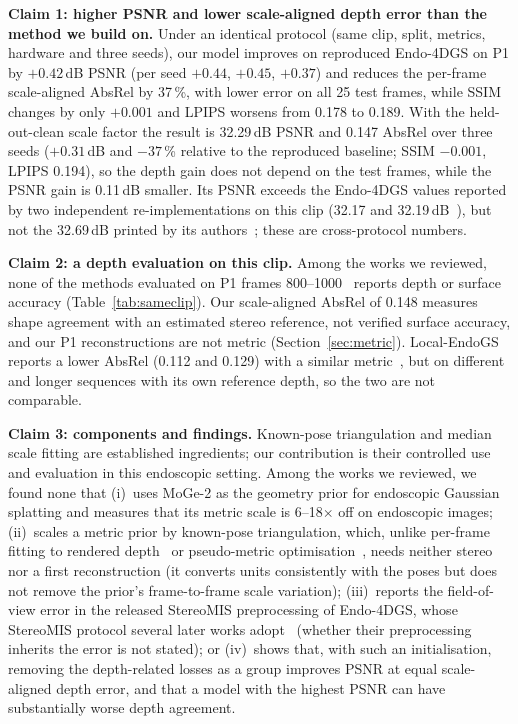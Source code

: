 \documentclass[conference]{IEEEtran}
\begin{document}
\textbf{Claim 1: higher PSNR and lower scale-aligned depth error than the method we build on.} Under an identical protocol (same clip, split, metrics, hardware and three seeds), our model improves on reproduced Endo-4DGS on P1 by $+0.42$\,dB PSNR (per seed $+0.44$, $+0.45$, $+0.37$) and reduces the per-frame scale-aligned AbsRel by 37\,\%, with lower error on all 25 test frames, while SSIM changes by only $+0.001$ and LPIPS worsens from 0.178 to 0.189. With the held-out-clean scale factor the result is 32.29\,dB PSNR and 0.147 AbsRel over three seeds ($+0.31$\,dB and $-37$\,\% relative to the reproduced baseline; SSIM $-0.001$, LPIPS 0.194), so the depth gain does not depend on the test frames, while the PSNR gain is 0.11\,dB smaller. Its PSNR exceeds the Endo-4DGS values reported by two independent re-implementations on this clip (32.17 and 32.19\,dB~\cite{yu2026endopairgs,liu2025endog2t}), but not the 32.69\,dB printed by its authors~\cite{huang2024endo4dgs}; these are cross-protocol numbers.

\textbf{Claim 2: a depth evaluation on this clip.} Among the works we reviewed, none of the methods evaluated on P1 frames 800--1000~\cite{huang2024endo4dgs,yu2026endopairgs,liu2025endog2t,wu2025endowave,wu2026endotsr} reports depth or surface accuracy (Table~\ref{tab:sameclip}). Our scale-aligned AbsRel of 0.148 measures shape agreement with an estimated stereo reference, not verified surface accuracy, and our P1 reconstructions are not metric (Section~\ref{sec:metric}). Local-EndoGS reports a lower AbsRel (0.112 and 0.129) with a similar metric~\cite{shan2026localendogs}, but on different and longer sequences with its own reference depth, so the two are not comparable.

\textbf{Claim 3: components and findings.} Known-pose triangulation and median scale fitting are established ingredients; our contribution is their controlled use and evaluation in this endoscopic setting. Among the works we reviewed, we found none that (i)~uses MoGe-2 as the geometry prior for endoscopic Gaussian splatting and measures that its metric scale is 6--18$\times$ off on endoscopic images; (ii)~scales a metric prior by known-pose triangulation, which, unlike per-frame fitting to rendered depth~\cite{shan2026localendogs} or pseudo-metric optimisation~\cite{khan2025unifying}, needs neither stereo nor a first reconstruction (it converts units consistently with the poses but does not remove the prior's frame-to-frame scale variation); (iii)~reports the field-of-view error in the released StereoMIS preprocessing of Endo-4DGS, whose StereoMIS protocol several later works adopt~\cite{liu2025endog2t,wu2025endowave,huang2025endo4dgx} (whether their preprocessing inherits the error is not stated); or (iv)~shows that, with such an initialisation, removing the depth-related losses as a group improves PSNR at equal scale-aligned depth error, and that a model with the highest PSNR can have substantially worse depth agreement.
\end{document}
